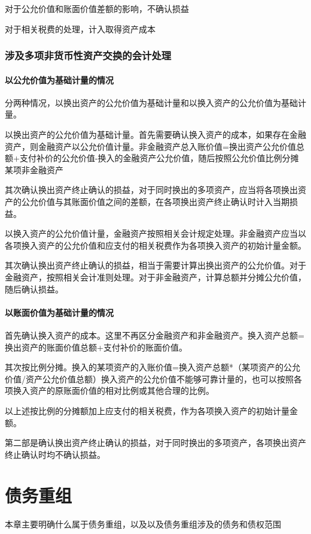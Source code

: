 \documentclass[UTF8,12pt]{ctexart}
\numberwithin{equation}{section} %
\numberwithin{figure}{section}
\numberwithin{table}{section}
\begin{document}
	对于公允价值和账面价值差额的影响，不确认损益
	
	对于相关税费的处理，计入取得资产成本
	
	\subsubsection{涉及多项非货币性资产交换的会计处理}
	\paragraph{以公允价值为基础计量的情况}
	分两种情况，以换出资产的公允价值为基础计量和以换入资产的公允价值为基础计量。
	
	以换出资产的公允价值为基础计量。首先需要确认换入资产的成本，如果存在金融资产，则金融资产以公允价值计量。非金融资产总入账价值=换出资产公允价值总额+支付补价的公允价值-换入的金融资产公允价值，随后按照公允价值比例分摊某项非金融资产
	
	其次确认换出资产终止确认的损益，对于同时换出的多项资产，应当将各项换出资产的公允价值与其账面价值之间的差额，在各项换出资产终止确认时计入当期损益。
	
	以换入资产的公允价值计量，金融资产按照相关会计规定处理。非金融资产应当以各项换入资产的公允价值和应支付的相关税费作为各项换入资产的初始计量金额。
	
	其次确认换出资产终止确认的损益，相当于需要计算出换出资产的公允价值。对于金融资产，按照相关会计准则处理。对于非金融资产，计算总额并分摊公允价值，随后确认损益。
	
	\paragraph{以账面价值为基础计量的情况}
	首先确认换入资产的成本。这里不再区分金融资产和非金融资产。换入资产总额=换出资产的账面价值总额+支付补价的账面价值。
	
	其次按比例分摊。换入的某项资产的入账价值=换入资产总额*（某项资产的公允价值/资产公允价值总额）换入资产的公允价值不能够可靠计量的，也可以按照各项换入资产的原账面价值的相对比例或其他合理的比例。
	
	以上述按比例的分摊额加上应支付的相关税费，作为各项换入资产的初始计量金额。
	
	第二部是确认换出资产终止确认的损益，对于同时换出的多项资产，各项换出资产终止确认时均不确认损益。
	
	\newpage
	\section{债务重组}
	本章主要明确什么属于债务重组，以及以及债务重组涉及的债务和债权范围
	
\end{document}
